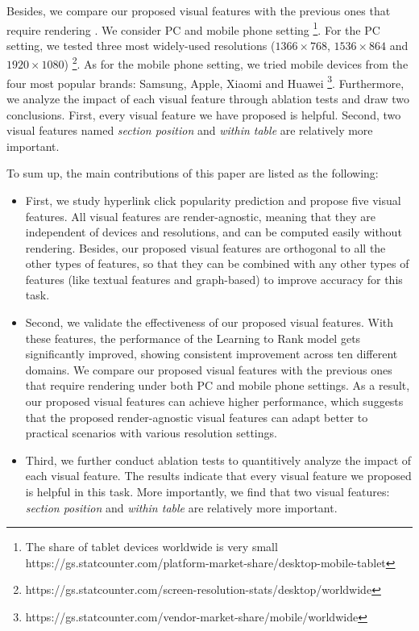 Besides, we compare our proposed visual features with the previous ones that require rendering \cite{dimitrov2017makes}. We consider PC and mobile phone setting \footnote{The share of tablet devices worldwide is very small https://gs.statcounter.com/platform-market-share/desktop-mobile-tablet}. For the PC setting, we tested three most widely-used resolutions ($1366\times768$, $1536\times864$ and $1920\times1080$) \footnote{https://gs.statcounter.com/screen-resolution-stats/desktop/worldwide}. As for the mobile phone setting, we tried mobile devices from the four most popular brands: Samsung, Apple, Xiaomi and Huawei \footnote{https://gs.statcounter.com/vendor-market-share/mobile/worldwide}. Furthermore, we analyze the impact of each visual feature through ablation tests and draw two conclusions. First, every visual feature we have proposed is helpful. Second, two visual features named \emph{section position} and \emph{within table} are relatively more important.

To sum up, the main contributions of this paper are listed as the following:

\begin{itemize}

    \item First, we study hyperlink click popularity prediction and propose five visual features. All visual features are render-agnostic, meaning that they are independent of devices and resolutions, and can be computed easily without rendering. Besides, our proposed visual features are orthogonal to all the other types of features, so that they can be combined with any other types of features (like textual features and graph-based) to improve accuracy for this task.

    \item Second, we validate the effectiveness of our proposed visual features. With these features, the performance of the Learning to Rank model gets significantly improved, showing consistent improvement across ten different domains. We compare our proposed visual features with the previous ones that require rendering \cite{dimitrov2017makes} under both PC and mobile phone settings. As a result, our proposed visual features can achieve higher performance, which suggests that the proposed render-agnostic visual features can adapt better to practical scenarios with various resolution settings.

    \item Third, we further conduct ablation tests to quantitively analyze the impact of each visual feature. The results indicate that every visual feature we proposed is helpful in this task. More importantly, we find that two visual features: \emph{section position} and \emph{within table} are relatively more important.

\end{itemize}
